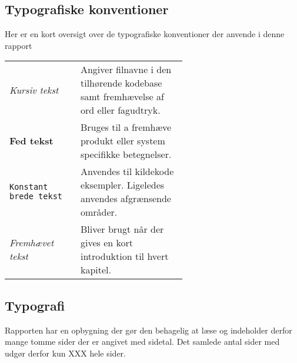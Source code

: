 \subsection{Typografiske konventioner}
Her er en kort oversigt over de typografiske konventioner der anvende i denne rapport\\
\begin{tabular}{l p{0.6\linewidth}}
	\textit{Kursiv tekst}			& Angiver filnavne i den tilhørende kodebase samt fremhævelse af ord eller fagudtryk. \\
	\textbf{Fed tekst}				& Bruges til a fremhæve produkt eller system specifikke betegnelser.\\
	\texttt{Konstant brede tekst}	& Anvendes til kildekode eksempler. Ligeledes anvendes afgrænsende områder.\\
	\emph{Fremhævet tekst}		    & Bliver brugt når der gives en kort introduktion til hvert kapitel.\\
\end{tabular}

\subsection{Typografi}
Rapporten har en opbygning der gør den behagelig at læse og indeholder derfor mange tomme sider der er angivet med sidetal.
Det samlede antal sider med udgør derfor kun XXX hele sider. 

%

